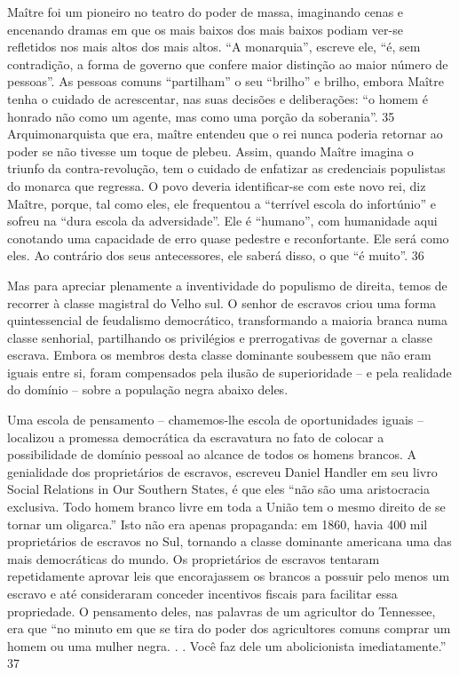 \par
 
Maître foi um pioneiro no teatro do poder de massa, imaginando cenas e encenando dramas em que os mais baixos dos mais baixos podiam ver-se refletidos nos mais altos dos mais altos. “A monarquia”, escreve ele, “é, sem contradição, a forma de governo que confere maior distinção ao maior número de pessoas”. As pessoas comuns “partilham” o seu “brilho” e brilho, embora Maître tenha o cuidado de acrescentar, nas suas decisões e deliberações: “o homem é honrado não como um agente, mas como uma porção da soberania”.
 {\color{blue} 35}  
Arquimonarquista que era, maître entendeu que o rei nunca poderia retornar ao poder se não tivesse um toque de plebeu. Assim, quando Maître imagina o triunfo da contra-revolução, tem o cuidado de enfatizar as credenciais populistas do monarca que regressa. O povo deveria identificar-se com este novo rei, diz Maître, porque, tal como eles, ele frequentou a “terrível escola do infortúnio” e sofreu na “dura escola da adversidade”. Ele é “humano”, com humanidade aqui conotando uma capacidade de erro quase pedestre e reconfortante. Ele será como eles. Ao contrário dos seus antecessores, ele saberá disso, o que “é muito”.
 {\color{blue} 36}  

 
\par
 
Mas para apreciar plenamente a inventividade do populismo de direita, temos de recorrer à classe magistral do Velho sul. O senhor de escravos criou uma forma quintessencial de feudalismo democrático, transformando a maioria branca numa classe senhorial, partilhando os privilégios e prerrogativas de governar a classe escrava. Embora os membros desta classe dominante soubessem que não eram iguais entre si, foram compensados ​​pela ilusão de superioridade – e pela realidade do domínio – sobre a população negra abaixo deles.
 
\par
 
Uma escola de pensamento – chamemos-lhe escola de oportunidades iguais – localizou a promessa democrática da escravatura no fato de colocar a possibilidade de domínio pessoal ao alcance de todos os homens brancos. A genialidade dos proprietários de escravos, escreveu Daniel Handler em seu livro Social Relations in Our Southern States, é que eles “não são uma aristocracia exclusiva. Todo homem branco livre em toda a União tem o mesmo direito de se tornar um oligarca.” Isto não era apenas propaganda: em 1860, havia 400 mil proprietários de escravos no Sul, tornando a classe dominante americana uma das mais democráticas do mundo. Os proprietários de escravos tentaram repetidamente aprovar leis que encorajassem os brancos a possuir pelo menos um escravo e até consideraram conceder incentivos fiscais para facilitar essa propriedade. O pensamento deles, nas palavras de um agricultor do Tennessee, era que “no minuto em que se tira do poder dos agricultores comuns comprar um homem ou uma mulher negra. . . Você faz dele um abolicionista imediatamente.”
 {\color{blue} 37}  

